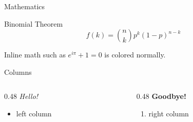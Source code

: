 \documentclass[aspectratio=169]{beamer}
\begin{document}
\begin{frame}{Mathematics}
  \begin{exampleblock}{Binomial Theorem}
    \begin{equation*}
      f\left(k\right) = \binom{n}{k} p^{k}\left(1-p\right)^{n-k}
    \end{equation*}
  \end{exampleblock}
  Inline math such as $e^{i\pi} + 1 = 0$ is colored normally.
\end{frame}

\begin{frame}{Columns}
  \begin{columns}
    \begin{column}{0.48\textwidth}
      \textit{Hello!}
      \begin{itemize}
        \item left column
      \end{itemize}
    \end{column}
    \begin{column}{0.48\textwidth}
      \textbf{Goodbye!}
      \begin{enumerate}
        \item right column
      \end{enumerate}
    \end{column}
  \end{columns}
\end{frame}
\end{document}
